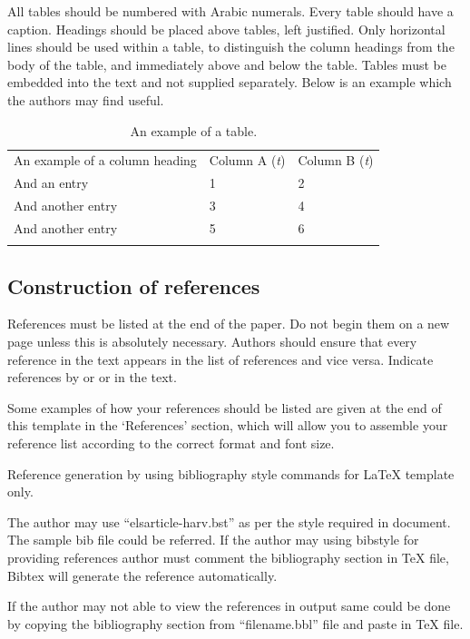 \documentclass[5p,times,procedia]{elsarticle}
\begin{document}
All tables should be numbered with Arabic numerals. Every table should have a caption. Headings should be placed above tables, left justified. Only horizontal lines should be used within a table, to distinguish the column headings from the body of the table, and immediately above and below the table. Tables must be embedded into the text and not supplied separately. Below is an example which the authors may find useful.

\begin{table}[h]
\caption{An example of a table.}
\begin{tabular*}{\hsize}{@{\extracolsep{\fill}}lll@{}}
\toprule
An example of a column heading & Column A ({\it{t}}) & Column B ({\it{t}})\\
\colrule
And an entry &   1 &  2\\
And another entry  & 3 &  4\\
And another entry &  5 &  6\\
\botrule
\end{tabular*}
\end{table}


\subsection{ Construction of references}

References must be listed at the end of the paper. Do not begin them on a new page unless this is absolutely necessary. Authors should ensure that every reference in the text appears in the list of references and vice versa. Indicate references by \cite{clark} or \cite{Deal} or \cite{Fachinger2006} in the text. 

Some examples of how your references should be listed are given at the end of this template in the `References' section, which will allow you to assemble your reference list according to the correct format and font size.

Reference generation by using bibliography style commands for LaTeX template only.

The author may use ``elsarticle-harv.bst'' as per the style required in document. The sample bib file could be referred. 
If the author may using bibstyle for providing references author must comment the bibliography section in TeX file, Bibtex will generate the reference automatically.

If the author may not able to view the references in output same could be done by copying the bibliography section from ``filename.bbl'' file and paste in TeX file.
\end{document}
